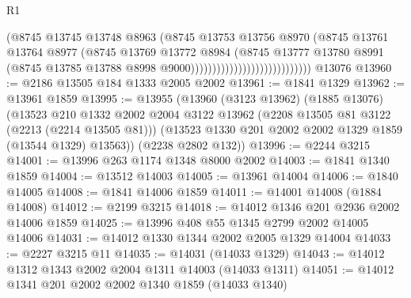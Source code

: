 \begin{lexlean}{R1}
\begin{coremodule}
                                                (@8745
                                                  @13745
                                                  @13748
                                                  @8963
                                                  (@8745
                                                    @13753
                                                    @13756
                                                    @8970
                                                    (@8745
                                                      @13761
                                                      @13764
                                                      @8977
                                                      (@8745
                                                        @13769
                                                        @13772
                                                        @8984
                                                        (@8745
                                                          @13777
                                                          @13780
                                                          @8991
                                                          (@8745
                                                            @13785
                                                            @13788
                                                            @8998
                                                            @9000))))))))))))))))))))))))))))
    @13076
@13960 := @2186 @13505 @184 @1333 @2005 @2002
@13961 := @1841 @1329
@13962 := @13961 @1859
@13995 := @13955
    (@13960
      (@3123 @13962)
      (@1885 @13076)
      (@13523
        @210
        @1332
        @2002
        @2004
        @3122
        @13962
        (@2208 @13505 @81 @3122 (@2213 (@2214 @13505 @81)))
        (@13523 @1330 @201 @2002 @2002 @1329 @1859 (@13544 @1329) @13563))
      (@2238 @2802 @132))
@13996 := @2244 @3215
@14001 := @13996 @263 @1174 @1348 @8000 @2002
@14003 := @1841 @1340 @1859
@14004 := @13512 @14003
@14005 := @13961 @14004
@14006 := @1840 @14005
@14008 := @1841 @14006 @1859
@14011 := @14001 @14008 (@1884 @14008)
@14012 := @2199 @3215
@14018 := @14012 @1346 @201 @2936 @2002 @14006 @1859
@14025 := @13996 @408 @55 @1345 @2799 @2002 @14005 @14006
@14031 := @14012 @1330 @1344 @2002 @2005 @1329 @14004
@14033 := @2227 @3215 @11
@14035 := @14031 (@14033 @1329)
@14043 := @14012 @1312 @1343 @2002 @2004 @1311 @14003 (@14033 @1311)
@14051 := @14012 @1341 @201 @2002 @2002 @1340 @1859 (@14033 @1340)

\end{coremodule}
\end{lexlean}
